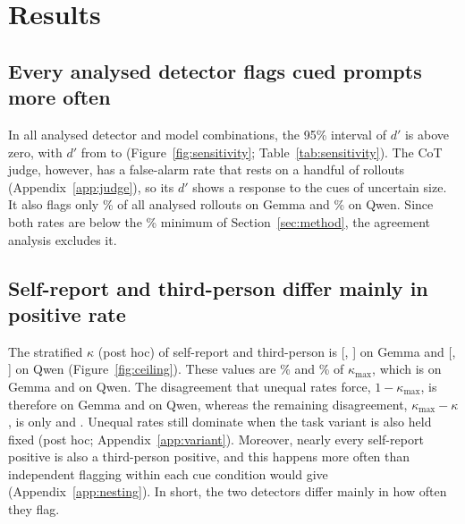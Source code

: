 \section{Results}
\label{sec:results}

\subsection{Every analysed detector flags cued prompts more often}
\label{sec:sensitivity}

In all  analysed detector and model combinations, the 95\% interval of
$d'$ is above zero, with $d'$ from  to 
(Figure~\ref{fig:sensitivity}; Table~\ref{tab:sensitivity}). The CoT judge, however, has a false-alarm rate that rests on a
handful of rollouts (Appendix~\ref{app:judge}), so its $d'$ shows a response to the cues of uncertain size. It also flags
only \% of all analysed rollouts on Gemma and \% on
Qwen. Since both rates are below the \% minimum of Section~\ref{sec:method}, the
agreement analysis excludes it.

\subsection{Self-report and third-person differ mainly in positive rate}
\label{sec:agreement}

The stratified $\kappa$ (post hoc) of self-report and third-person is
 [,
] on Gemma and 
[, ] on Qwen
(Figure~\ref{fig:ceiling}). These values are \% and
\% of $\kappa_{\max}$, which is
 on Gemma and  on Qwen. The
disagreement that unequal rates force, $1 - \kappa_{\max}$, is therefore
 on Gemma and  on Qwen,
whereas the remaining disagreement, $\kappa_{\max} - \kappa$, is only
 and . Unequal rates still dominate when
the task variant is also held fixed (post hoc; Appendix~\ref{app:variant}). Moreover, nearly
every self-report positive is also a third-person positive, and this happens more often than
independent flagging within each cue condition would give (Appendix~\ref{app:nesting}). In
short, the two detectors differ mainly in how often they flag.

